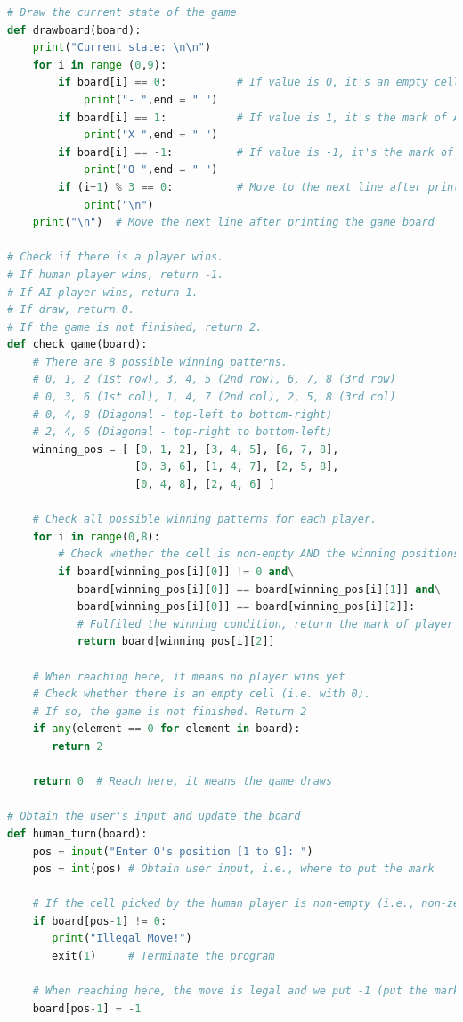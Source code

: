 \documentclass{book}
\begin{document}
\begin{lstlisting}[language=Python, basicstyle=\ttfamily\small, keywordstyle=\color{blue}, commentstyle=\color{forestgreen}, stringstyle=\color{red}, showstringspaces=false]
# Draw the current state of the game
def drawboard(board):
    print("Current state: \n\n")
    for i in range (0,9):
        if board[i] == 0:           # If value is 0, it's an empty cell
            print("- ",end = " ")
        if board[i] == 1:           # If value is 1, it's the mark of AI
            print("X ",end = " ")
        if board[i] == -1:          # If value is -1, it's the mark of human
            print("O ",end = " ")
        if (i+1) % 3 == 0:          # Move to the next line after printing 3 elements
            print("\n")
    print("\n")  # Move the next line after printing the game board

# Check if there is a player wins.
# If human player wins, return -1.
# If AI player wins, return 1.
# If draw, return 0.
# If the game is not finished, return 2.
def check_game(board):
    # There are 8 possible winning patterns.
    # 0, 1, 2 (1st row), 3, 4, 5 (2nd row), 6, 7, 8 (3rd row)
    # 0, 3, 6 (1st col), 1, 4, 7 (2nd col), 2, 5, 8 (3rd col)
    # 0, 4, 8 (Diagonal - top-left to bottom-right)
    # 2, 4, 6 (Diagonal - top-right to bottom-left)
    winning_pos = [ [0, 1, 2], [3, 4, 5], [6, 7, 8],
                    [0, 3, 6], [1, 4, 7], [2, 5, 8],
                    [0, 4, 8], [2, 4, 6] ]

    # Check all possible winning patterns for each player.
    for i in range(0,8):
        # Check whether the cell is non-empty AND the winning positions with the same mark
        if board[winning_pos[i][0]] != 0 and\
           board[winning_pos[i][0]] == board[winning_pos[i][1]] and\
           board[winning_pos[i][0]] == board[winning_pos[i][2]]:
           # Fulfiled the winning condition, return the mark of player
           return board[winning_pos[i][2]]

    # When reaching here, it means no player wins yet
    # Check whether there is an empty cell (i.e. with 0).
    # If so, the game is not finished. Return 2
    if any(element == 0 for element in board):
       return 2

    return 0  # Reach here, it means the game draws

# Obtain the user's input and update the board
def human_turn(board):
    pos = input("Enter O's position [1 to 9]: ")
    pos = int(pos) # Obtain user input, i.e., where to put the mark

    # If the cell picked by the human player is non-empty (i.e., non-zero), illegal
    if board[pos-1] != 0:
       print("Illegal Move!")
       exit(1)     # Terminate the program

    # When reaching here, the move is legal and we put -1 (put the mark of human player)
    board[pos-1] = -1
\end{lstlisting}
\end{document}
